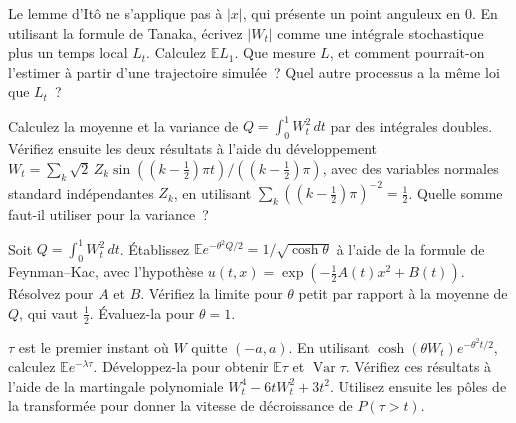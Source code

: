 \begin{question}\label{iq:iv1:stochastic-calculus:27}
Le lemme d'Itô ne s'applique pas à $|x|$, qui présente un point anguleux en 0. En utilisant la formule de Tanaka, écrivez $|W_t|$ comme une intégrale stochastique plus un temps local $L_t$. Calculez $\mathbb{E}L_1$. Que mesure $L$, et comment pourrait-on l'estimer à partir d'une trajectoire simulée~? Quel autre processus a la même loi que $L_t$~?
\end{question}

\begin{question}\label{iq:iv1:stochastic-calculus:28}
Calculez la moyenne et la variance de $Q = \int_0^1W_t^2\,dt$ par des intégrales doubles. Vérifiez ensuite les deux résultats à l'aide du développement $W_t = \sum_k\sqrt{2}\,Z_k\sin((k - \frac12)\pi t)/((k - \frac12)\pi)$, avec des variables normales standard indépendantes $Z_k$, en utilisant $\sum_k((k - \frac12)\pi)^{-2} = \frac12$. Quelle somme faut-il utiliser pour la variance~?
\end{question}

\begin{question}\label{iq:iv1:stochastic-calculus:29}
Soit $Q = \int_0^1W_t^2\,dt$. Établissez $\mathbb{E}e^{-\theta^2Q/2} = 1/\sqrt{\cosh\theta}$ à l'aide de la formule de Feynman--Kac, avec l'hypothèse $u(t, x) = \exp(-\frac12A(t)x^2 + B(t))$. Résolvez pour $A$ et $B$. Vérifiez la limite pour $\theta$ petit par rapport à la moyenne de $Q$, qui vaut $\frac12$. Évaluez-la pour $\theta = 1$.
\end{question}

\begin{question}\label{iq:iv1:stochastic-calculus:30}
$\tau$ est le premier instant où $W$ quitte $(-a, a)$. En utilisant $\cosh(\theta W_t)e^{-\theta^2t/2}$, calculez $\mathbb{E}e^{-\lambda\tau}$. Développez-la pour obtenir $\mathbb{E}\tau$ et $\operatorname{Var}\tau$. Vérifiez ces résultats à l'aide de la martingale polynomiale $W_t^4 - 6tW_t^2 + 3t^2$. Utilisez ensuite les pôles de la transformée pour donner la vitesse de décroissance de $P(\tau > t)$.
\end{question}
